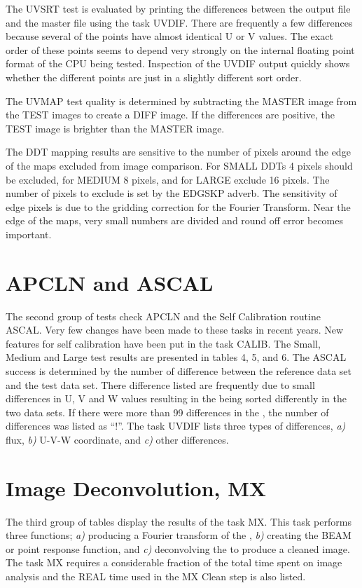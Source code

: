 The UVSRT test is evaluated by printing the differences between
the output file and the master file using the task UVDIF.
There are frequently a few differences because several of the
\uvdata points have almost identical U or V values.
The exact order of these points seems to depend
very strongly on the internal floating point format of the
CPU being tested.  Inspection of the UVDIF output quickly
shows whether the different points are just in a slightly
different sort order.

The UVMAP test quality is determined by subtracting
the MASTER image from the TEST images to create a DIFF image.
If the differences are positive, the TEST image is brighter
than the MASTER image.

The DDT mapping results are sensitive to the
number of pixels around the edge of the maps excluded from
image comparison.  For SMALL DDTs 4 pixels should be excluded,
for MEDIUM 8 pixels, and for LARGE exclude 16 pixels.
The number of pixels to exclude is set by the EDGSKP adverb.
The sensitivity of edge pixels is due to the gridding correction
for the Fourier Transform.  Near the edge of the maps,
very small numbers are divided and round off error
becomes important.

\section{APCLN and ASCAL}
The second group of tests check APCLN and the Self Calibration
routine ASCAL.  Very few changes have been made to these
tasks in recent years.  New features for self calibration have
been put in the task CALIB.
The Small, Medium and Large test results are presented in tables 4, 5,
and 6.  The ASCAL success is determined by the number of
difference between the reference data set and the test data set.
There difference listed are frequently due to small differences in
U, V and W values resulting in the \uvdata being sorted differently
in the two data sets.  If there were more than 99 differences in
the \uvdata, the number of differences was listed as ``!''.
The \AIPS task UVDIF lists three types of differences,
{\it a)} flux,
{\it b)} U-V-W coordinate, and
{\it c)} other differences.

\section{Image Deconvolution, MX}
The third group of tables display the results of the task MX.
This task performs three functions;
{\it a)} producing a Fourier transform of the \uvdata,
{\it b)} creating the BEAM or point response function, and
{\it c)} deconvolving the \uvdata to produce a cleaned image.
The task MX requires a considerable fraction of the total
time spent on image analysis
and the REAL time used in the MX Clean step is also listed.

